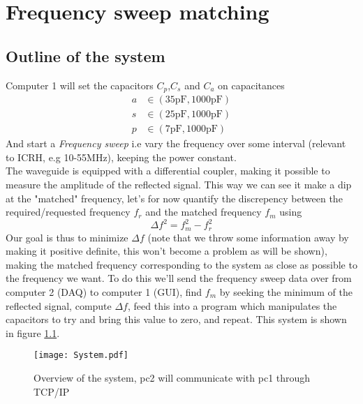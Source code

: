 \chapter{Frequency sweep matching}
\section{Outline of the system}
Computer 1 will set the capacitors $C_p$,$C_s$ and $C_a$ on capacitances
\begin{eqnarray}
	a &\in (\text{35pF},\text{1000pF})\\
	s &\in (\text{25pF},\text{1000pF})\\
	p &\in (\text{7pF},\text{1000pF})
\end{eqnarray}
And start a \textit{Frequency sweep} i.e vary the frequency over some interval
(relevant to ICRH, e.g 10-55MHz), keeping the power constant.\\ The waveguide
is equipped with a differential coupler, making it possible to measure the
amplitude of the reflected signal. This way we can see it make a dip at the
"matched" frequency, let's for now quantify the discrepency between the
required/requested frequency $f_r$ and the matched frequency $f_m$ using
\begin{equation}
	\Delta f^2 = f_m^2 - f_r^2
\end{equation}
Our goal is thus to minimize $\Delta f$ (note that we throw some information
away by making it positive definite, this won't become a problem as will be shown),
making the matched frequency corresponding to the system as close as possible
to the frequency we want. To do this we'll send the frequency sweep data over
from computer 2 (DAQ) to computer 1 (GUI), find $f_m$ by seeking the minimum of
the reflected signal, compute $\Delta f$, feed this into a program which
manipulates the capacitors to try and bring this value to zero, and repeat.
This system is shown in figure 
\ref{fig:system}.
\begin{figure}[h]
	\texttt{[image: System.pdf]}
	\caption{Overview of the system, pc2 will communicate with pc1 through TCP/IP}
	\label{fig:system}
\end{figure}
